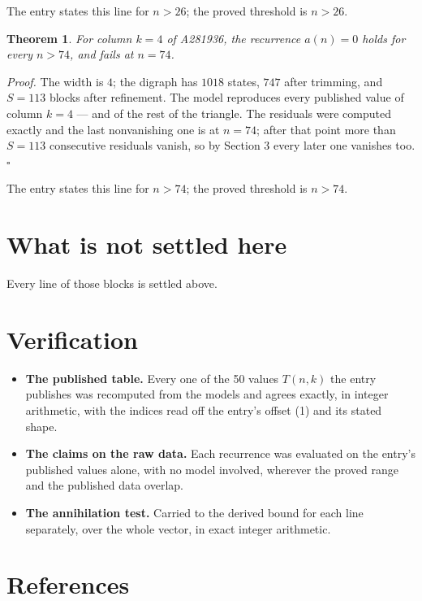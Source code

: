 \documentclass[11pt]{article}
\newtheorem{theorem}{Theorem}
\theoremstyle{definition}
\begin{document}
The entry states this line for $n > 26$; the proved threshold is $n > 26$.

\begin{theorem} For column $k = 4$ of A281936, the recurrence $a(n) = 0$ holds for every $n > 74$, and fails at $n = 74$.\end{theorem}

{\itshape Proof.} The width is $4$; the digraph has $1018$ states, $747$ after trimming, and $S = 113$ blocks after refinement. The model reproduces every published value of column $k = 4$ --- and of the rest of the triangle. The residuals were computed exactly and the last nonvanishing one is at $n = 74$; after that point more than $S = 113$ consecutive residuals vanish, so by Section 3 every later one vanishes too. $\square$

The entry states this line for $n > 74$; the proved threshold is $n > 74$.

\section{What is not settled here}

Every line of those blocks is settled above.

\section{Verification}

\begin{itemize}

\item {\bfseries The published table.} Every one of the 50 values $T(n,k)$ the entry publishes was recomputed from the models and agrees exactly, in integer arithmetic, with the indices read off the entry's offset (1) and its stated shape.

\item {\bfseries The claims on the raw data.} Each recurrence was evaluated on the entry's published values alone, with no model involved, wherever the proved range and the published data overlap.

\item {\bfseries The annihilation test.} Carried to the derived bound for each line separately, over the whole vector, in exact integer arithmetic.

\end{itemize}

\section{References}
\end{document}
